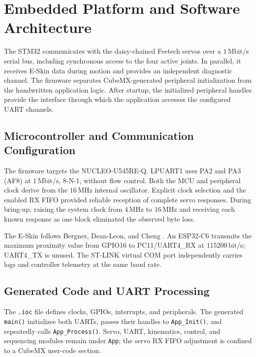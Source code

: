 \section{Embedded Platform and Software Architecture}
\label{sec:embedded_platform}

The STM32 communicates with the daisy-chained Feetech servos over a
\(1\,\mathrm{Mbit/s}\) serial bus, including synchronous access to the four
active joints. In parallel, it receives E-Skin data during motion and provides
an independent diagnostic channel. The firmware separates CubeMX-generated
peripheral initialization from the handwritten application logic. After
startup, the initialized peripheral handles provide the interface through
which the application accesses the configured UART channels.

\subsection{Microcontroller and Communication Configuration}

The firmware targets the NUCLEO-U545RE-Q. LPUART1 uses PA2 and PA3 (AF8) at
\(1\,\mathrm{Mbit/s}\), 8-N-1, without flow control. Both the MCU and peripheral
clock derive from the \(16\,\mathrm{MHz}\) internal oscillator. Explicit clock
selection and the enabled RX FIFO provided reliable reception of complete servo
responses. During bring-up, raising the system clock from \(4\,\mathrm{MHz}\) to
\(16\,\mathrm{MHz}\) and receiving each known response as one block eliminated
the observed byte loss.

The E-Skin follows Bergner, Dean-Leon, and Cheng
\cite{bergner2020eskin}. An ESP32-C6 transmits the maximum proximity value from
GPIO16 to PC11/UART4\_RX at \(115200\,\mathrm{bit/s}\); UART4\_TX is unused.
The ST-LINK virtual COM port independently carries logs and controller
telemetry at the same baud rate.

\subsection{Generated Code and UART Processing}

The \texttt{.ioc} file defines clocks, GPIOs, interrupts, and peripherals. The
generated \texttt{main()} initializes both UARTs, passes their handles to
\texttt{App\_Init()}, and repeatedly calls \texttt{App\_Process()}. Servo,
UART, kinematics, control, and sequencing modules remain under \texttt{App};
the servo RX FIFO adjustment is confined to a CubeMX user-code section.

